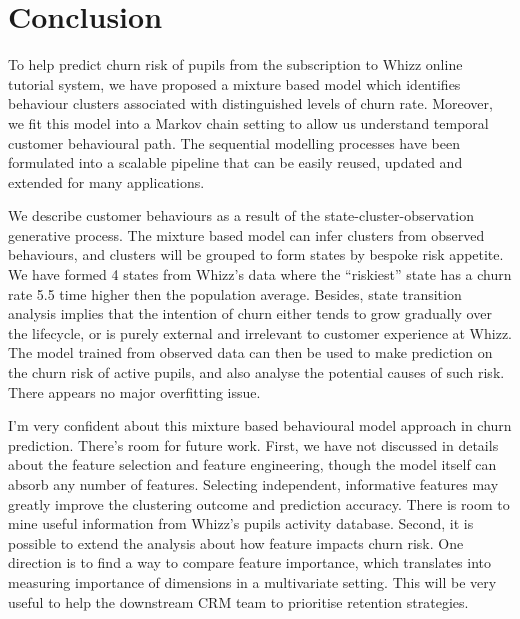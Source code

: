 \section{Conclusion}
\label{sec:conclusion}

To help predict churn risk of pupils from the subscription to Whizz online tutorial system, we have proposed a mixture based model which identifies behaviour clusters associated with distinguished levels of churn rate. Moreover, we fit this model into a Markov chain setting  to allow us understand temporal customer behavioural path. The sequential modelling processes have been formulated into a scalable pipeline that can be easily reused, updated and extended for many applications.

We describe customer behaviours as a result of the state-cluster-observation generative process. The mixture based model can infer clusters from observed behaviours, and clusters will be grouped to form states by bespoke risk appetite. We have formed 4 states from Whizz's data where the ``riskiest'' state has a churn rate 5.5 time higher then the population average. Besides, state transition analysis implies that the intention of churn either tends to grow gradually over the lifecycle, or is purely external and irrelevant to customer experience at Whizz. The model trained from observed data can then be used to make prediction on the churn risk of active pupils, and also analyse the potential causes of such risk. There appears no major overfitting issue.

I'm very confident about this mixture based behavioural model approach in churn prediction. There's room for future work. First, we have not discussed in details about the feature selection and feature engineering, though the model itself can absorb any number of features. Selecting independent, informative features may greatly improve the clustering outcome and prediction accuracy. There is room to mine useful information from Whizz's pupils activity database. Second, it is possible to extend the analysis about how feature impacts churn risk. One direction is to find a way to compare feature importance, which translates into measuring importance of dimensions in a multivariate setting. This will be very useful to help the downstream CRM team to prioritise retention strategies.  
